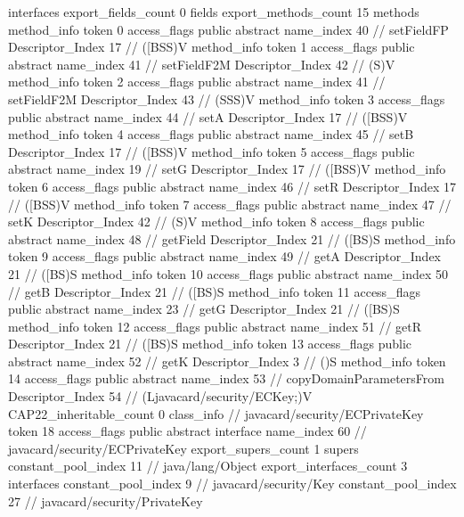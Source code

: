 {{{			interfaces {
			}
			export_fields_count	0
			fields {
			}
			export_methods_count	15
			methods {
				method_info {
					token	0
					access_flags	public abstract
					name_index	40		// setFieldFP
					Descriptor_Index	17		// ([BSS)V
				}
				method_info {
					token	1
					access_flags	public abstract
					name_index	41		// setFieldF2M
					Descriptor_Index	42		// (S)V
				}
				method_info {
					token	2
					access_flags	public abstract
					name_index	41		// setFieldF2M
					Descriptor_Index	43		// (SSS)V
				}
				method_info {
					token	3
					access_flags	public abstract
					name_index	44		// setA
					Descriptor_Index	17		// ([BSS)V
				}
				method_info {
					token	4
					access_flags	public abstract
					name_index	45		// setB
					Descriptor_Index	17		// ([BSS)V
				}
				method_info {
					token	5
					access_flags	public abstract
					name_index	19		// setG
					Descriptor_Index	17		// ([BSS)V
				}
				method_info {
					token	6
					access_flags	public abstract
					name_index	46		// setR
					Descriptor_Index	17		// ([BSS)V
				}
				method_info {
					token	7
					access_flags	public abstract
					name_index	47		// setK
					Descriptor_Index	42		// (S)V
				}
				method_info {
					token	8
					access_flags	public abstract
					name_index	48		// getField
					Descriptor_Index	21		// ([BS)S
				}
				method_info {
					token	9
					access_flags	public abstract
					name_index	49		// getA
					Descriptor_Index	21		// ([BS)S
				}
				method_info {
					token	10
					access_flags	public abstract
					name_index	50		// getB
					Descriptor_Index	21		// ([BS)S
				}
				method_info {
					token	11
					access_flags	public abstract
					name_index	23		// getG
					Descriptor_Index	21		// ([BS)S
				}
				method_info {
					token	12
					access_flags	public abstract
					name_index	51		// getR
					Descriptor_Index	21		// ([BS)S
				}
				method_info {
					token	13
					access_flags	public abstract
					name_index	52		// getK
					Descriptor_Index	3		// ()S
				}
				method_info {
					token	14
					access_flags	public abstract
					name_index	53		// copyDomainParametersFrom
					Descriptor_Index	54		// (Ljavacard/security/ECKey;)V
				}
			}
			CAP22_inheritable_count	0
		}
		class_info {		// javacard/security/ECPrivateKey
			token	18
			access_flags	public abstract interface
			name_index	60		// javacard/security/ECPrivateKey
			export_supers_count	1
			supers {
				constant_pool_index	11		// java/lang/Object
			}
			export_interfaces_count	3
			interfaces {
				constant_pool_index	9		// javacard/security/Key
				constant_pool_index	27		// javacard/security/PrivateKey
}}}}
